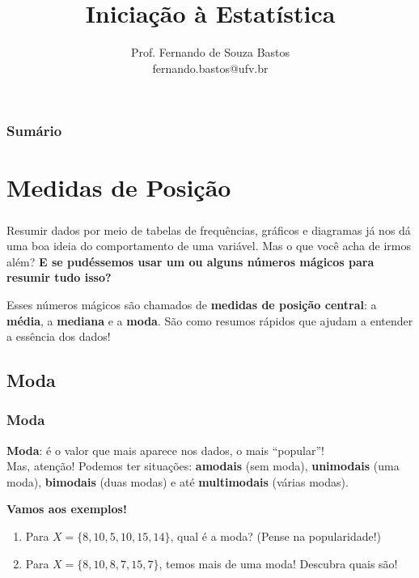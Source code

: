 \documentclass[14pt,aspectratio=1610]{beamer}
\title{Iniciação à Estatística}
\author{Prof. Fernando de Souza Bastos \texorpdfstring{\\ fernando.bastos@ufv.br}{}}
\institute{Departamento de Estatística \texorpdfstring{\\ Universidade Federal de Viçosa}{}\texorpdfstring{\\ Campus UFV - Viçosa}{}}
\date{}
\begin{document}
%

\frame{\titlepage}

\begin{frame}{}
\frametitle{\bf Sumário}
\tableofcontents
\end{frame}

\section{Medidas de Posição}
\begin{frame}{}
	\frametitle{}
	\begin{block}{}
		\justifying
		Resumir dados por meio de tabelas de frequências, gráficos e diagramas já nos dá uma boa ideia do comportamento de uma variável. Mas o que você acha de irmos além? \textbf{E se pudéssemos usar um ou alguns números mágicos para resumir tudo isso?}
	\end{block}
	\pause
	\begin{block}{}
		\justifying
		Esses números mágicos são chamados de \textbf{medidas de posição central}: a \textbf{média}, a \textbf{mediana} e a \textbf{moda}. São como resumos rápidos que ajudam a entender a essência dos dados!
	\end{block}
\end{frame}

\subsection{Moda}
\begin{frame}{}
	\frametitle{Moda}
	\begin{block}{}
		\justifying
		\textbf{Moda}: é o valor que mais aparece nos dados, o mais ``popular''! \\
		Mas, atenção! Podemos ter situações: \textbf{amodais} (sem moda), \textbf{unimodais} (uma moda), \textbf{bimodais} (duas modas) e até \textbf{multimodais} (várias modas).
		
		\textbf{Vamos aos exemplos!}
		\begin{enumerate}
			\item  Para $X = \{8, 10, 5, 10, 15, 14\}$, qual é a moda? (Pense na popularidade!) \pause
			\item Para $X = \{8, 10, 8, 7, 15, 7\}$, temos mais de uma moda! Descubra quais são!
		\end{enumerate}
	\end{block}
\end{frame}
\end{document}
